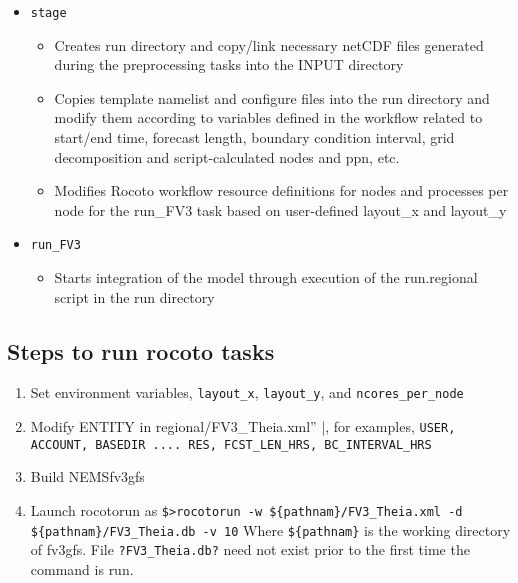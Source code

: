 \begin{itemize}
\begin{itemize}
    \end{itemize}
\item \verb|stage|
    \begin{itemize}
    \item Creates run directory and copy/link necessary netCDF files generated during the preprocessing tasks into the INPUT directory
    \item Copies template namelist and configure files into the run directory and modify them according to variables defined in the workflow related to start/end time, forecast length, boundary condition interval, grid decomposition and script-calculated nodes and ppn, etc.
    \item Modifies Rocoto workflow resource definitions for nodes and processes per node for the run\_FV3 task based on user-defined layout\_x and layout\_y 
\end{itemize}
\item \verb|run_FV3|
    \begin{itemize}
    \item Starts integration of the model through execution of the run.regional script in the run directory
    \end{itemize}
\end{itemize}


\subsection{Steps to run rocoto tasks}

\begin{enumerate}
\item Set environment variables, \verb|layout_x|, \verb|layout_y|, and \verb|ncores_per_node|
\item Modify ENTITY in \verb ''regional/FV3_Theia.xml'' |, for examples, 
\verb|USER, ACCOUNT, BASEDIR .... RES, FCST_LEN_HRS, BC_INTERVAL_HRS|
\item Build NEMSfv3gfs
\item Launch rocotorun as
\verb|$>rocotorun -w ${pathnam}/FV3_Theia.xml -d ${pathnam}/FV3_Theia.db -v 10|
Where \verb|${pathnam}| is the working directory of fv3gfs. File \verb|?FV3_Theia.db?| need not exist prior to the first time the command is run.
\end{enumerate}



